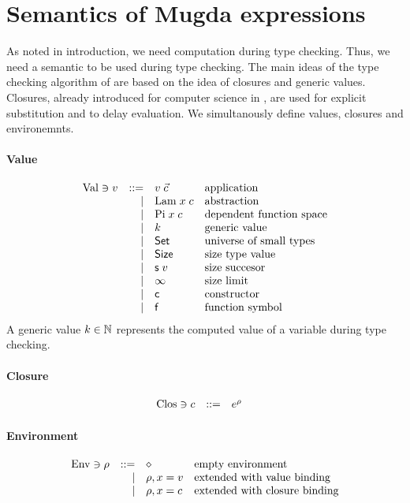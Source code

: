 \section{Semantics of Mugda expressions}
As noted in introduction, we need computation during type checking.
Thus, we need a semantic to be used during type checking.
The main ideas of the type checking algorithm of \cite{coquand96algoritm} are based on the idea of closures and generic values.
Closures, already introduced for computer science in \cite{Landin63}, are used for explicit substitution and to delay evaluation.
We simultanously define values, closures and environemnts.
 
\paragraph{Value}
\[
\begin{array}{lrll}
\mathrm{Val} \ni v & ::= & v \; \vec{c} & \mbox{application}\\
& \mid & \mathrm{Lam} \; x \; c & \mbox{abstraction}\\
& \mid & \mathrm{Pi} \; x \; c & \mbox{dependent function space}\\
& \mid & k & \mbox{generic value}\\
& \mid & \mathsf{Set} & \mbox{universe of small types} \\
& \mid & \mathsf{Size} & \mbox{size type value}\\
& \mid & \mathsf{s}\; v & \mbox{size succesor}\\
& \mid & \infty & \mbox{size limit}\\
& \mid & \mathsf{c} & \mbox{constructor}\\
& \mid & \mathsf{f} & \mbox{function symbol}\\
\end{array}
\]
A generic value $k \in \mathbb{N}$ represents the computed value of a variable during type checking.
\paragraph{Closure}
\[
\begin{array}{lrll}
\mathrm{Clos} \ni c & ::= & e^{\rho} & 
\end{array}
\]

\paragraph{Environment}
\[
\begin{array}{lrll}
\mathrm{Env} \ni \rho & ::= & \diamond & \mbox{empty environment}\\
& \mid & \rho,x = v & \mbox{extended with value binding}\\
& \mid & \rho,x = c & \mbox{extended with closure binding} 
\end{array}
\]


